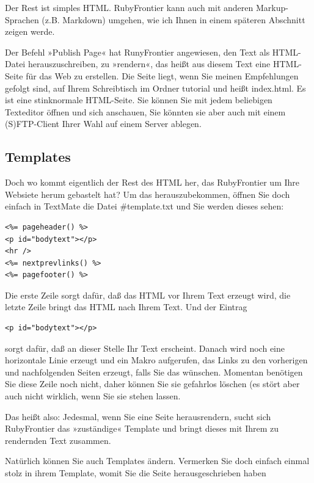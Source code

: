 \documentclass[11pt]{report}
\begin{document}
Der Rest ist simples HTML. RubyFrontier kann auch mit anderen
Markup-Sprachen (z.B. Markdown) umgehen, wie ich Ihnen in einem
späteren Abschnitt zeigen werde.


Der Befehl »Publish Page« hat RunyFrontier angewiesen, den Text als
HTML-Datei herauszuschreiben, zu »rendern«, das heißt aus diesem Text
eine HTML-Seite für das Web zu erstellen. Die Seite liegt, wenn Sie
meinen Empfehlungen gefolgt sind, auf Ihrem Schreibtisch im Ordner
tutorial und heißt index.html. Es ist eine stinknormale
HTML-Seite. Sie können Sie mit jedem beliebigen Texteditor öffnen und
sich anschauen, Sie könnten sie aber auch mit einem (S)FTP-Client
Ihrer Wahl auf einem Server ablegen.
\subsection{Templates}
\label{sec-1-2-2-2}


Doch wo kommt eigentlich der Rest des HTML her, das RubyFrontier um
Ihre Websiete herum gebastelt hat? Um das herauszubekommen, öffnen Sie
doch einfach in TextMate die Datei \#template.txt und Sie werden dieses
sehen:



\begin{verbatim}
<%= pageheader() %>
<p id="bodytext"></p>
<hr />
<%= nextprevlinks() %>
<%= pagefooter() %>
\end{verbatim}

Die erste Zeile sorgt dafür, daß das HTML vor Ihrem Text erzeugt wird,
die letzte Zeile bringt das HTML nach Ihrem Text. Und der Eintrag


\begin{verbatim}
<p id="bodytext"></p>
\end{verbatim}

sorgt dafür, daß an dieser Stelle Ihr Text erscheint. Danach wird noch
eine horizontale Linie erzeugt und ein Makro aufgerufen, das Links zu
den vorherigen und nachfolgenden Seiten erzeugt, falls Sie das
wünschen. Momentan benötigen Sie diese Zeile noch nicht, daher können
Sie sie gefahrlos löschen (es stört aber auch nicht wirklich, wenn Sie
sie stehen lassen.


Das heißt also: Jedesmal, wenn Sie eine Seite herausrendern, sucht
sich RubyFrontier das »zuständige« Template und bringt dieses mit
Ihrem zu rendernden Text zusammen.


Natürlich können Sie auch Templates ändern. Vermerken Sie doch einfach
einmal stolz in ihrem Template, womit Sie die Seite herausgeschrieben
haben
\end{document}
